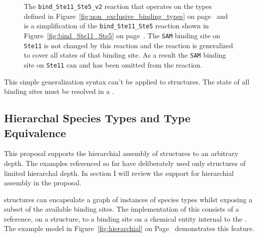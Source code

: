 \documentclass{cekarticle}
\begin{document}
\begin{figure}[h]
  \caption{
  The \texttt{bind\_Ste11\_Ste5\_v2} reaction that operates on the types defined in
  Figure~\ref{fig:non_exclusive_binding_types} on page~\pageref{fig:non_exclusive_binding_types}
  and is a simplification of the \texttt{bind\_Ste11\_Ste5}
  reaction shown in Figure~\ref{fig:bind_Ste11_Ste5} on page~\pageref{fig:bind_Ste11_Ste5}.
  The \texttt{SAM} binding site on \texttt{Ste11} is not changed by
  this reaction and the reaction is generalized to cover all states of that binding site.  As a result
  the \texttt{SAM} binding site on \texttt{Ste11} can and has been omitted from the reaction.}

  \label{fig:bind_Ste11_Ste5_v2}
\end{figure}

This simple generalization syntax can't be applied to  structures.
The state of all binding sites must be resolved in a .

\subsection{Hierarchal Species Types and Type Equivalence}

This proposal supports the hierarchial assembly of  structures to an arbitrary depth.
The examples referenced so far have deliberately used only structures of limited hierarchal depth.  In
section I will review the support for hierarchial assembly in the proposal.

 structures can encapsulate a graph of instances of species types whilst exposing
a subset of the available binding sites.  The implementation of this consists of a reference,
on a  structure, to a binding site on a chemical entity internal to the
.  The example model in Figure~\ref{fig:hierarchial} on Page~\pageref{fig:hierarchial}
demonstrates this feature.
\end{document}
